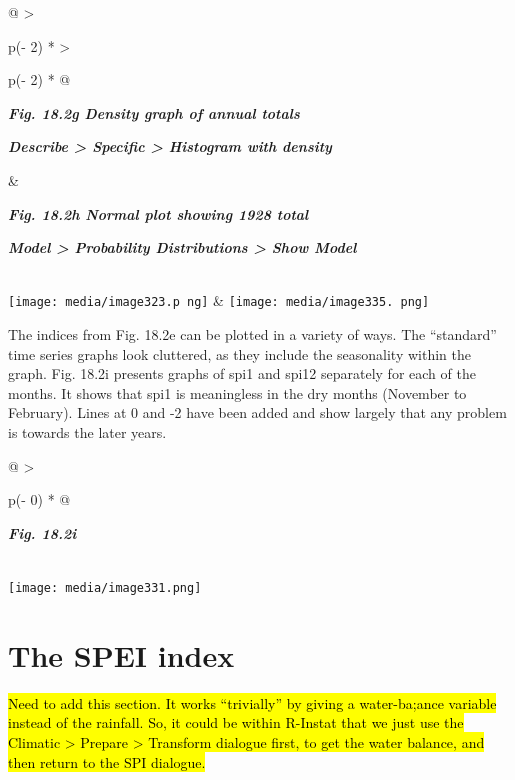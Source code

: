 \documentclass[
  letterpaper,
  DIV=11,
  numbers=noendperiod]{scrreprt}
\begin{document}
\begin{longtable}[]{@{}
  >{\raggedright\arraybackslash}p{(\columnwidth - 2\tabcolsep) * }
  >{\raggedright\arraybackslash}p{(\columnwidth - 2\tabcolsep) * }@{}}
\toprule\noalign{}
\begin{minipage}[b]{\linewidth}\raggedright
\textbf{\emph{Fig. 18.2g Density graph of annual totals}}

\textbf{\emph{Describe \textgreater{} Specific \textgreater{} Histogram
with density}}
\end{minipage} & \begin{minipage}[b]{\linewidth}\raggedright
\textbf{\emph{Fig. 18.2h Normal plot showing 1928 total}}

\textbf{\emph{Model \textgreater{} Probability Distributions
\textgreater{} Show Model}}
\end{minipage} \\
\midrule\noalign{}
\endhead
\bottomrule\noalign{}
\endlastfoot
\texttt{[image: media/image323.p ng]}
&
\texttt{[image: media/image335. png]} \\
\end{longtable}

The indices from Fig. 18.2e can be plotted in a variety of ways. The
``standard'' time series graphs look cluttered, as they include the
seasonality within the graph. Fig. 18.2i presents graphs of spi1 and
spi12 separately for each of the months. It shows that spi1 is
meaningless in the dry months (November to February). Lines at 0 and -2
have been added and show largely that any problem is towards the later
years.

\begin{longtable}[]{@{}
  >{\raggedright\arraybackslash}p{(\columnwidth - 0\tabcolsep) * }@{}}
\toprule\noalign{}
\begin{minipage}[b]{\linewidth}\raggedright
\textbf{\emph{Fig. 18.2i}}
\end{minipage} \\
\midrule\noalign{}
\endhead
\bottomrule\noalign{}
\endlastfoot
\texttt{[image: media/image331.png]} \\
\end{longtable}

\section{The SPEI index}\label{the-spei-index}

\hl{Need to add this section. It works ``trivially'' by giving a
water-ba;ance variable instead of the rainfall. So, it could be within
R-Instat that we just use the Climatic \textgreater{} Prepare
\textgreater{} Transform dialogue first, to get the water balance, and
then return to the SPI dialogue.}
\end{document}
